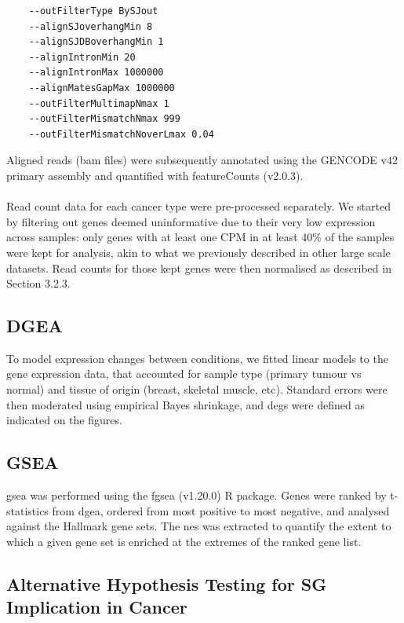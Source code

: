 \begin{lstlisting}
	--outFilterType BySJout
	--alignSJoverhangMin 8
	--alignSJDBoverhangMin 1
	--alignIntronMin 20
	--alignIntronMax 1000000
	--alignMatesGapMax 1000000
	--outFilterMultimapNmax 1
	--outFilterMismatchNmax 999
	--outFilterMismatchNoverLmax 0.04
\end{lstlisting}
\noindent
Aligned reads (\gls{bam} files) were subsequently annotated using the GENCODE v42 primary assembly\cite{frankish_gencode_2021} and quantified with featureCounts (v2.0.3)\cite{liao_featurecounts_2014}.
\\
\\
Read count data for each cancer type were pre-processed separately. We started by filtering out genes deemed uninformative due to their very low expression across samples: only genes with at least one CPM in at least 40\% of the samples were kept for analysis, akin to what we previously described in other large scale datasets\cite{schneider_voyager_2024}. Read counts for those kept genes were then normalised as described in Section 3.2.3.

\subsection{DGEA}

To model expression changes between conditions, we fitted linear models to the gene expression data, that accounted for sample type (primary tumour vs normal) and tissue of origin (breast, skeletal muscle, etc). Standard errors were then moderated using empirical Bayes shrinkage\cite{smyth_linear_nodate}, and \gls{deg}s were defined as indicated on the figures.

\subsection{GSEA}

\gls{gsea}\cite{subramanian_gene_2005} was performed using the fgsea (v1.20.0)\cite{korotkevich_fast_2016} R package. Genes were ranked by t-statistics from \gls{dgea}, ordered from most positive to most negative, and analysed against the Hallmark gene sets\cite{liberzon_molecular_2015}. The \gls{nes} was extracted to quantify the extent to which a given gene set is enriched at the extremes of the ranked gene list.

\subsection{Alternative Hypothesis Testing for SG Implication in Cancer}

